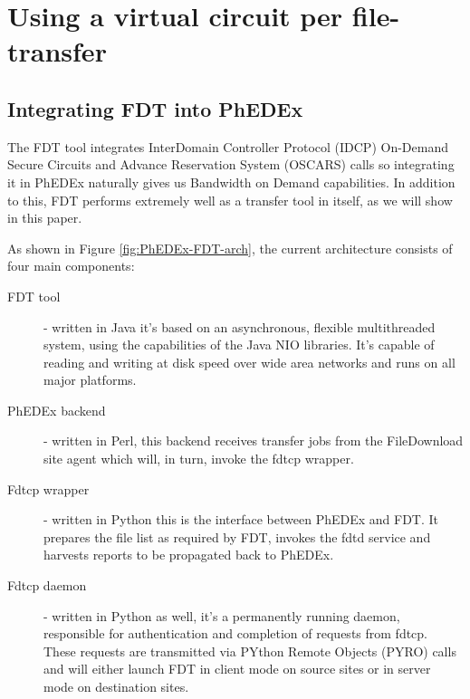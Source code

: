 \section{Using a virtual circuit per file-transfer}

\subsection{Integrating FDT into PhEDEx}
The FDT tool integrates InterDomain Controller Protocol (IDCP)
On-Demand Secure Circuits and Advance Reservation System (OSCARS\cite{OSCARS}) calls so
integrating it in PhEDEx naturally gives us Bandwidth on Demand
capabilities. In addition to this, FDT performs extremely well
as a transfer tool in itself, as we will show in this paper.

As shown in Figure \ref{fig:PhEDEx-FDT-arch}, the current architecture consists
of four main components:
\begin{description}
	\item[FDT tool] - written in Java it's based on an asynchronous, flexible 
multithreaded system, using the capabilities of the Java NIO 
libraries. It's capable of reading and writing at disk speed over wide area 
networks and runs on all major platforms. 
	\item[PhEDEx backend] - written in Perl, this backend
receives transfer jobs from the FileDownload site agent which will, in turn, 
invoke the fdtcp wrapper. 
	\item[Fdtcp wrapper] - written in Python this is the
interface between PhEDEx and FDT. It prepares the file list as required by FDT, 
invokes the fdtd service and harvests reports to be propagated back to PhEDEx.
	\item[Fdtcp daemon] - written in Python as well, it's
a permanently running daemon, responsible for authentication and completion of requests
from fdtcp. These requests are transmitted via PYthon Remote Objects (PYRO)
calls and will either launch FDT in client mode on source sites or in server
mode on destination sites.
\end{description}

